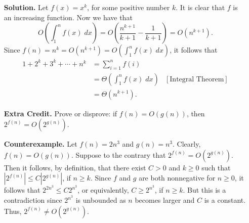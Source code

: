 \documentclass[9pt]{article}
\begin{document}
\begin{enumerate}
      \textbf{Solution.} Let $f(x) = x^k$, for some positive number $k$. It is
      clear that $f$ is an increasing function. Now we have that
      $$O\left(\int_1^nf(x)\;dx\right) = O\left(\frac{n^{k+1}}{k+1} -
          \frac{1}{k+1}\right) = O(n^{k+1}).$$
      Since $f(n) = n^k = O(n^{k+1}) = O\left(\int_1^nf(x)\;dx\right)$, it 
      follows that
      \begin{align*}
         1 + 2^k + 3^k + \cdots + n^k &= \sum_{i=1}^nf(i) \\
            &= \Theta\left(\int_1^nf(x)\;dx\right) &[\text{Integral Theorem}]\\
            &= \Theta(n^{k+1}).
      \end{align*}
   \item[\textbf{Extra Credit.}] Prove or disprove: if $f(n) = O(g(n))$, then
                                 $2^{f(n)} = O(2^{g(n)})$.

      \textbf{Counterexample.} Let $f(n) = 2n^3$ and $g(n) = n^3$. Clearly,
      $f(n) = O(g(n))$. Suppose to the contrary that $2^{f(n)} = O(2^{g(n)})$.
      Then it follows, by definition, that there exist $C > 0$ and $k \ge 0$
      such that $|2^{f(n)}| \le C|2^{g(n)}|$, if $n \ge k$. Since $f$ and $g$
      are both nonnegative for $n \ge 0$, it follows that $2^{2n^3}\le C2^{n^3}$,
      or equivalently, $C \ge 2^{n^3}$, if $n \ge k$. But this is a
      contradiction since $2^{n^3}$ is unbounded as $n$ becomes larger and $C$
      is a constant. Thus, $2^{f(n)} \neq O(2^{g(n)})$.
      
\end{enumerate}
\end{document}
